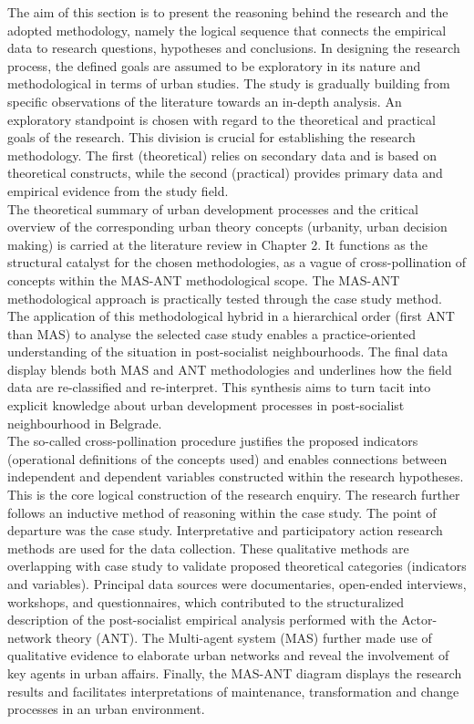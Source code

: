 \documentclass[11pt]{report}
\begin{document}
The aim of this section is to present the reasoning behind the research and the adopted methodology, namely the logical sequence that connects the empirical data to research questions, hypotheses and conclusions. In designing the research process, the defined goals are assumed to be exploratory in its nature and methodological in terms of urban studies. The study is gradually building from specific observations of the literature towards an in-depth analysis. An exploratory standpoint is chosen with regard to the theoretical and practical goals of the research. This division is crucial for establishing the research methodology. The first (theoretical) relies on secondary data and is based on theoretical constructs, while the second (practical) provides primary data and empirical evidence from the study field.
\\
The theoretical summary of urban development processes and the critical overview of the corresponding urban theory concepts (urbanity, urban decision making) is carried at the literature review in Chapter 2. It functions as the structural catalyst for the chosen methodologies, as a vague of cross-pollination of concepts within the MAS-ANT methodological scope. The MAS-ANT methodological approach is practically tested through the case study method. The application of this methodological hybrid in a hierarchical order (first ANT than MAS) to analyse the selected case study enables a practice-oriented understanding of the situation in post-socialist neighbourhoods. The final data display blends both MAS and ANT methodologies and underlines how the field data are re-classified and re-interpret. This synthesis aims to turn tacit into explicit knowledge about urban development processes in post-socialist neighbourhood in Belgrade.
\\
The so-called cross-pollination procedure justifies the proposed indicators (operational definitions of the concepts used) and enables connections between independent and dependent variables constructed within the research hypotheses. This is the core logical construction of the research enquiry. The research further follows an inductive method of reasoning within the case study. The point of departure was the case study. Interpretative and participatory action research methods are used for the data collection. These qualitative methods are overlapping with case study to validate proposed theoretical categories (indicators and variables). Principal data sources were documentaries, open-ended interviews, workshops, and questionnaires, which contributed to the structuralized description of the post-socialist empirical analysis performed with the Actor-network theory (ANT). The Multi-agent system (MAS) further made use of qualitative evidence to elaborate urban networks and reveal the involvement of key agents in urban affairs. Finally, the MAS-ANT diagram displays the research results and facilitates interpretations of maintenance, transformation and change processes in an urban environment.
\end{document}
